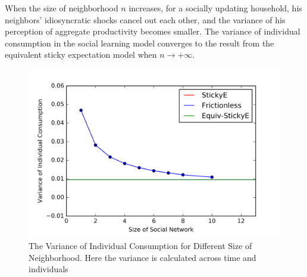 \documentclass[12pt,letterpaper]{article}
\begin{document}
When the size of neighborhood $n$ increases, for a socially updating household, his neighbors' idiosyncratic shocks cancel out each other, and the variance of his perception of aggregate productivity becomes smaller. The variance of individual consumption in the social learning model converges to the result from the equivalent sticky expectation model when $n\rightarrow+\infty$.
\begin{figure}[h]
	\includegraphics[scale=0.7]{p_ind.png}
	\centering
	\caption{The Variance of Individual Consumption for Different Size of Neighborhood. Here the variance is calculated across time and individuals}
	\label{figure:IndModel}
\end{figure}
\end{document}
